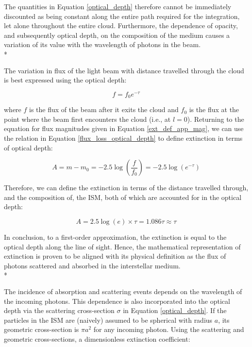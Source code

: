 \documentclass[12pt, a4paper]{report}
\begin{document}
The quantities in Equation \ref{optical_depth} therefore cannot be immediately discounted as being constant along the entire path required for the integration, let alone throughout the entire cloud. Furthermore, the dependence of opacity, and subsequently optical depth, on the composition of the medium causes a variation of its value with the wavelength of photons in the beam.\\*

The variation in flux of the light beam with distance travelled through the cloud is best expressed using the optical depth:

\begin{equation}
f = f_{0} e^{-\tau}
\label{flux_loss_optical_depth}
\end{equation}

where $f$ is the flux of the beam after it exits the cloud and $f_{0}$ is the flux at the point where the beam first encounters the cloud (i.e., at $l = 0$). Returning to the equation for flux magnitudes given in Equation \ref{ext_def_app_mag}, we can use the relation in Equation \ref{flux_loss_optical_depth} to define extinction in terms of optical depth:

\begin{equation}
A = m - m_{0} = -2.5\log\left(\frac{f}{f_{0}}\right) = -2.5\log(e^{-\tau})
\label{ext_optical_depth_mags}
\end{equation}

Therefore, we can define the extinction in terms of the distance travelled through, and the composition of, the ISM, both of which are accounted for in the optical depth:

\begin{equation}
A = 2.5\log(e) \times \tau = 1.086\tau \approx \tau
\label{ext_optical_depth}
\end{equation}

In conclusion, to a first-order approximation, the extinction is equal to the optical depth along the line of sight. Hence, the mathematical representation of extinction is proven to be aligned with its physical definition as the flux of photons scattered and absorbed in the interstellar medium. \\*

The incidence of absorption and scattering events depends on the wavelength of the incoming photons. This dependence is also incorporated into the optical depth via the scattering cross-section $\sigma$ in Equation \ref{optical_depth}. If the particles in the ISM are (naively) assumed to be spherical with radius $a$, its geometric cross-section is $\pi a^{2}$ for any incoming photon. Using the scattering and geometric cross-sections, a dimensionless extinction coefficient:
\end{document}
